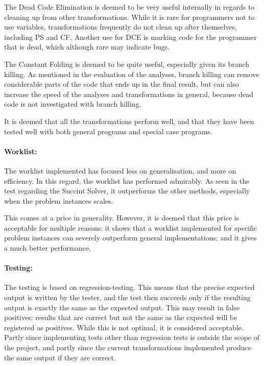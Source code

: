 The Dead Code Elimination is deemed to be very useful internally in regards
to cleaning up from other transformations. While it is rare for programmers
not to use variables, transformations frequently do not clean up after themselves,
including PS and CF. Another use for DCE is marking code for the programmer
that is dead, which although rare may indicate bugs.

The Constant Folding is deemed to be quite useful, especially given its
branch killing. As mentioned in the evaluation of the analyses,
branch killing can remove considerable parts of the code that ends up
in the final result, but can also increase the speed of the analyses and
transformations in general, because dead code is not investigated with
branch killing.

It is deemed that all the transformations perform well, and that they
have been tested well with both general programs and special case programs.

\paragraph{Worklist:}
The worklist implemented has focused less on generalisation, and more
on efficiency. In this regard, the worklist has performed admirably.
As seen in the test regarding the Succint Solver, it outperforms
the other methods, especially when the problem instances scales.

This comes at a price in generality. However, it is deemed that
this price is acceptable for multiple reasons: it shows that a worklist
implemented for specific problem instances can severely outperform
general implementations; and it gives a much better performance.

\paragraph{Testing:}

The testing is based on regression-testing. This means that the precise expected
output is written by the tester, and the test then succeeds only if the resulting
output is exactly the same as the expected output. This may result in false positives:
results that are correct but not the same as the expected will be registered as positives.
While this is not optimal, it is considered acceptable. Partly since implementing tests other
than regression tests is outside the scope of the project, and partly since the current
transformations implemented produce the same output if they are correct.


